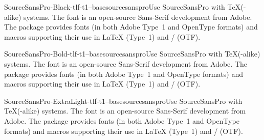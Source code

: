 \documentclass{ddltxtyp}
\begin{document}
\begin{package}{SourceSansPro-Black-tlf-t1--base}{sourcesanspro}{Use SourceSansPro with {\TeX}(-alike) systems.}
The font is an open-source Sans-Serif development from Adobe.
The package provides fonts (in both Adobe Type~1 and OpenType
formats) and macros supporting their use in {\LaTeX} (Type~1) and
{\XeLaTeX}/{\LuaLaTeX} (OTF).
\end{package}
\begin{package}{SourceSansPro-Bold-tlf-t1--base}{sourcesanspro}{Use SourceSansPro with {\TeX}(-alike) systems.}
The font is an open-source Sans-Serif development from Adobe.
The package provides fonts (in both Adobe Type~1 and OpenType
formats) and macros supporting their use in {\LaTeX} (Type~1) and
{\XeLaTeX}/{\LuaLaTeX} (OTF).
\end{package}
\begin{package}{SourceSansPro-ExtraLight-tlf-t1--base}{sourcesanspro}{Use SourceSansPro with {\TeX}(-alike) systems.}
The font is an open-source Sans-Serif development from Adobe.
The package provides fonts (in both Adobe Type~1 and OpenType
formats) and macros supporting their use in {\LaTeX} (Type~1) and
{\XeLaTeX}/{\LuaLaTeX} (OTF).
\end{package}
\end{document}
